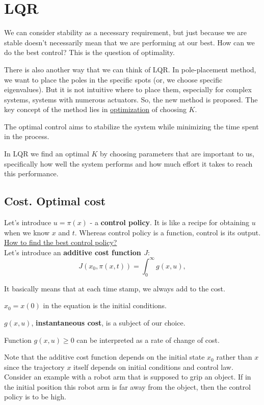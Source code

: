 \section{LQR}

We can consider stability as a necessary requirement, but just because we are stable doesn't necessarily mean that we are performing at our best.
How can we do the best control? This is the question of optimality. 

There is also another way that we can think of LQR. In pole-placement method, we want to place the poles in the specific spots (or, we choose specific eigenvalues). But it is not intuitive where to place them, especially for complex systems, systems with numerous actuators.
So, the new method is proposed. The key concept of the method lies in \underline{optimization} of choosing \(K\). 

The optimal control aims to stabilize the system while minimizing the time spent in the process.

In LQR we find an optimal \(K\) by choosing parameters that are important to us, specifically how well the system performs and how much effort it takes to reach this performance.


\subsection{Cost. Optimal cost}

Let's introduce $u = \pi(x)$ - a \textbf{control policy}. It is like a recipe for obtaining $u$ when we know $x$ and $t$. Whereas control policy is a function, 
control is its output. \\

\underline{How to find the best control policy?}\\

Let's introduce an \textbf{additive cost function \(J\)}:
\[J(x_0, \pi(x, t)) = \int_{0}^{\infty} g(x, u), \]

It basically means that at each time stamp, we always add to the cost. 

$x_0 = x(0)$ in the equation is the initial conditions. 

$g(x, u)$, \textbf{instantaneous cost}, is a subject of our choice. 

Function $g(x, u) \geq 0$ can be interpreted as a rate of change of cost.

Note that the additive cost function depends on the initial state $x_0$ rather than $x$ since the trajectory $x$  itself depends on initial conditions and control law. Consider an example with a robot arm that is supposed to grip an object. 
If in the initial position this robot arm is far away from the object, then the control policy is to be high.



